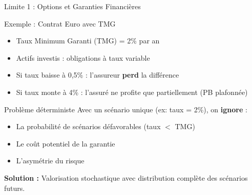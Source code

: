 \documentclass[10pt,aspectratio=169]{beamer}
\begin{document}
\begin{frame}{Limite 1 : Options et Garanties Financières}
\begin{block}{Exemple : Contrat Euro avec TMG}
\begin{itemize}
    \item Taux Minimum Garanti (TMG) = 2\% par an
    \item Actifs investis : obligations à taux variable
    \item Si taux baisse à 0,5\% : l'assureur \textbf{perd} la différence
    \item Si taux monte à 4\% : l'assuré ne profite que partiellement (PB plafonnée)
\end{itemize}
\end{block}

\begin{alertblock}{Problème déterministe}
Avec un scénario unique (ex: taux = 2\%), on \textbf{ignore} :
\begin{itemize}
    \item La probabilité de scénarios défavorables (taux $<$ TMG)
    \item Le coût potentiel de la garantie
    \item L'asymétrie du risque
\end{itemize}
\end{alertblock}

\textbf{Solution : } Valorisation stochastique avec \alert{distribution complète} des scénarios futurs.
\end{frame}
\end{document}
